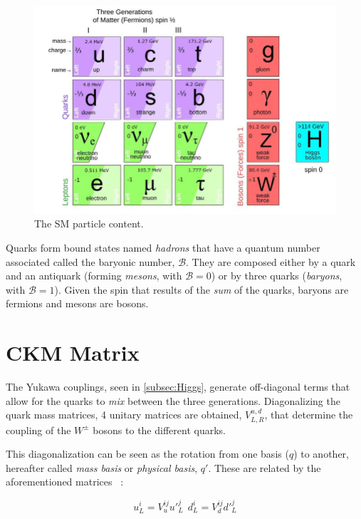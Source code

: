 \begin{figure} [htb!]
\begin{center}
\includegraphics[scale=0.5]{figs/particle_content.jpg}
\caption{The SM particle content. \label{fig:particle_content}}
\end{center}
\end{figure}

Quarks form bound states named \textit{hadrons} that have a quantum number associated called the baryonic number, $\mathcal{B}$. They are composed either by a quark and an antiquark (forming \textit{mesons}, with $\mathcal{B} = 0$) or by three quarks (\textit{baryons}, with $\mathcal{B}=1$). Given the spin that results of the \textit{sum} of the quarks, baryons are fermions and mesons are bosons. 

\section{CKM Matrix} 
The Yukawa couplings, seen in \ref{subsec:Higgs}, generate off-diagonal terms that allow for the quarks to \textit{mix} between the three generations. Diagonalizing the quark mass matrices, 4 unitary matrices are obtained, $V_{L,R}^{u,d}$, that determine the coupling of the $W^{\pm}$ bosons to the different quarks. 

This diagonalization can be seen as the rotation from one basis ($q$) to another, hereafter called \textit{mass basis} or \textit{physical basis}, $q'$. These are related by the aforementioned matrices ~\cite{CKM}:

\begin{equation}
u_L^i = V_u^{ij} u'^{j}_L \ \ d_L^i = V_d^{ij}d'^{j}_L 
\end{equation}

